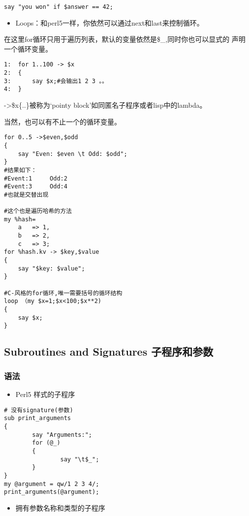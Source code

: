 \documentclass{ctexart}
\begin{document}
\begin{lstlisting}
say "you won" if $answer == 42;
\end{lstlisting}
\begin{itemize}
\item Loops：和perl5一样，你依然可以通过next和last来控制循环。
\end{itemize}

在这里for循环只用于遍历列表，默认的变量依然是\$\_,同时你也可以显式的
声明一个循环变量。

\begin{lstlisting}
1:  for 1..100 -> $x
2:  {
3:      say $x;#会输出1 2 3 。。
4:  }
\end{lstlisting}
->\$x\{..\}被称为‘pointy block'如同匿名子程序或者lisp中的lambda。

当然，也可以有不止一个的循环变量。

\begin{lstlisting}
for 0..5 ->$even,$odd
{
    say "Even: $even \t Odd: $odd";
}
#结果如下：
#Event:1     Odd:2
#Event:3     Odd:4
#也就是交替出现

#这个也是遍历哈希的方法
my %hash=
    a   => 1,
    b   => 2,
    c   => 3;
for %hash.kv -> $key,$value
{
    say "$key: $value";
}

#C-风格的for循环,唯一需要括号的循环结构
loop （my $x=1;$x<100;$x**2)
{
    say $x;
}
\end{lstlisting}
\subsection{Subroutines and Signatures 子程序和参数}
\label{sec-4-5}
\subsubsection{语法}
\label{sec-4-5-1}

\begin{itemize}
\item Perl5 样式的子程序
\end{itemize}

\begin{lstlisting}
# 没有signature(参数)
sub print_arguments 
{
        say "Arguments:";
        for (@_)
        {
                say "\t$_";
        }
}
my @argument = qw/1 2 3 4/;
print_arguments(@argument);
\end{lstlisting}
\begin{itemize}
\item 拥有参数名称和类型的子程序
\end{itemize}
\end{document}
